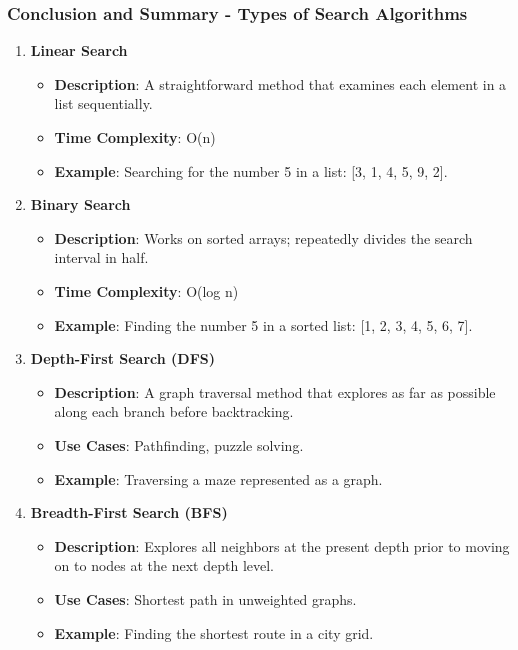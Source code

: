 \documentclass[aspectratio=169]{beamer}
\begin{document}
\begin{frame}[fragile]
    \frametitle{Conclusion and Summary - Types of Search Algorithms}
    \begin{enumerate}
        \item \textbf{Linear Search}
            \begin{itemize}
                \item \textbf{Description}: A straightforward method that examines each element in a list sequentially.
                \item \textbf{Time Complexity}: O(n)
                \item \textbf{Example}: Searching for the number 5 in a list: [3, 1, 4, 5, 9, 2].
            \end{itemize}

        \item \textbf{Binary Search}
            \begin{itemize}
                \item \textbf{Description}: Works on sorted arrays; repeatedly divides the search interval in half.
                \item \textbf{Time Complexity}: O(log n)
                \item \textbf{Example}: Finding the number 5 in a sorted list: [1, 2, 3, 4, 5, 6, 7].
            \end{itemize}

        \item \textbf{Depth-First Search (DFS)}
            \begin{itemize}
                \item \textbf{Description}: A graph traversal method that explores as far as possible along each branch before backtracking.
                \item \textbf{Use Cases}: Pathfinding, puzzle solving.
                \item \textbf{Example}: Traversing a maze represented as a graph.
            \end{itemize}

        \item \textbf{Breadth-First Search (BFS)}
            \begin{itemize}
                \item \textbf{Description}: Explores all neighbors at the present depth prior to moving on to nodes at the next depth level.
                \item \textbf{Use Cases}: Shortest path in unweighted graphs.
                \item \textbf{Example}: Finding the shortest route in a city grid.
            \end{itemize}
    \end{enumerate}
\end{frame}
\end{document}
